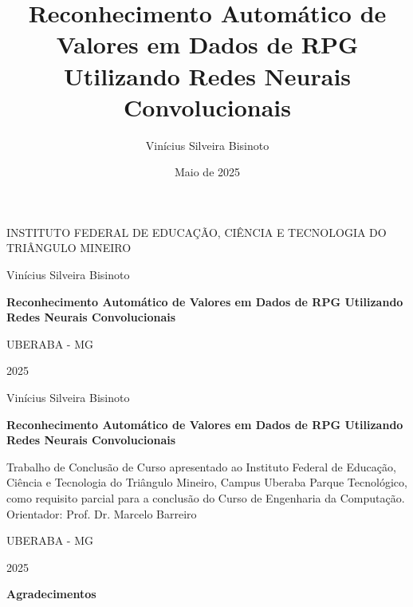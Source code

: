 \documentclass[12pt]{article}
\title{Reconhecimento Automático de Valores em Dados de RPG Utilizando Redes Neurais Convolucionais}
\author{Vinícius Silveira Bisinoto}
\date{Maio de 2025}
\begin{document}
\begin{titlepage}
    \centering
    {\scshape\Large INSTITUTO FEDERAL DE EDUCAÇÃO, CIÊNCIA E TECNOLOGIA DO TRIÂNGULO MINEIRO \par}
    \vfill
    {\Large Vinícius Silveira Bisinoto\par}
    \vfill
    {\bfseries\Large Reconhecimento Automático de Valores em Dados de RPG Utilizando Redes Neurais Convolucionais\par}
    \vfill
    {\large UBERABA - MG\par}
    {\large 2025\par}
\end{titlepage}

\begin{titlepage}
    \centering
    {\Large Vinícius Silveira Bisinoto\par}
    \vspace{1.5cm}
    {\bfseries\Large Reconhecimento Automático de Valores em Dados de RPG Utilizando Redes Neurais Convolucionais\par}
    \vfill
    \begin{flushright}
        \begin{minipage}{0.5\textwidth}
            Trabalho de Conclusão de Curso apresentado ao Instituto Federal de Educação, 
            Ciência e Tecnologia do Triângulo Mineiro, Campus Uberaba Parque Tecnológico, 
            como requisito parcial para a conclusão do Curso de Engenharia da Computação.\\
            Orientador: Prof. Dr. Marcelo Barreiro
        \end{minipage}
    \end{flushright}
    \vfill
    {\large UBERABA - MG\par}
    {\large2025\par}
\end{titlepage}
\begin{center}
    \Large\textbf{Agradecimentos}
\end{center}
\end{document}
